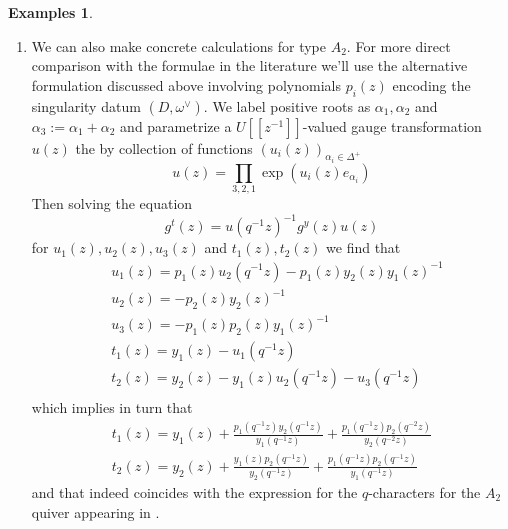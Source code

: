 \documentclass[11pt, oneside, reqno]{amsart}
\theoremstyle{definition} \newtheorem{definition}{Definition}[section]
\theoremstyle{definition} \newtheorem{remark}[definition]{Remark}
\theoremstyle{definition} \newtheorem{remarks}[definition]{Remarks}
\theoremstyle{definition} \newtheorem{question}[definition]{Question}
\theoremstyle{definition} \newtheorem*{note}{Note}
\theoremstyle{definition} \newtheorem{example}[definition]{Example}
\theoremstyle{definition} \newtheorem{examples}[definition]{Examples}
\begin{document}
\begin{examples}
\begin{enumerate}
 \item We can also make concrete calculations for type $A_2$.  For more direct comparison with the formulae in the literature we'll use the alternative formulation discussed above involving polynomials $p_i(z)$ encoding the singularity datum $(D, \omega^\vee)$.  We label positive roots as $\alpha_1, \alpha_2$ and $\alpha_3:=\alpha_1 + \alpha_2$ and parametrize a $U[[z^{-1}]]$-valued
  gauge transformation $u(z)$ the by collection of functions  
 $(u_{i}(z))_{\alpha_i  \in \Delta^{+}}$ 
  \begin{equation}
    u(z) = \prod_{3,2,1} \exp( u_{i}(z) e_{\alpha_i})
  \end{equation}
Then solving the equation 
\begin{equation}
g^t(z) =  u(q^{-1} z)^{-1} g^y(z) u(z)
\end{equation}
for $u_{1}(z), u_{2}(z), u_{3}(z)$ and $t_{1}(z), t_{2}(z)$  we find that
\begin{equation*}
\begin{aligned}
& u_{1}(z) = p_{1}(z) u_{2}(q^{-1} z)-p_{1}(z) y_{2}(z) y_{1}(z)^{-1} \\
& u_{2}(z) =  -p_{2}(z) y_{2}(z)^{-1} \\
& u_{3}(z) = -p_{1}(z) p_{2}(z) y_{1}(z)^{-1} \\
& t_{1}(z) = y_{1}(z)-u_{1}(q^{-1}z) \\
& t_{2}(z) = y_{2}(z) - y_{1}(z) u_{2}(q^{-1}z)-u_{3}(q^{-1}z) \\
\end{aligned}
\end{equation*}
which implies in turn that
\begin{equation*}
  \begin{aligned}
    t_{1}(z) =y_{1}(z)  +  \frac{p_{1}(q^{-1}z) y_{2}(q^{-1}z)}{y_{1}(q^{-1}z)} + \frac{p_{1}(q^{-1}z) p_{2}(q^{-2} z)}{ y_{2}(q^{-2} z)}\\
    t_{2}(z) = y_{2}(z)  +\frac{y_{1}(z) p_{2}(q^{-1}z)}{y_{2}(q^{-1}z)}+   \frac{p_{1}(q^{-1}z) p_{2}(q^{-1}z)}{y_{1}(q^{-1}z)}
  \end{aligned}
\end{equation*}
and that indeed coincides with the expression for the $q$-characters for the $A_2$ quiver appearing in
\cite{Nekrasov:2015wsu,NekrasovPestunShatashvili,NekrasovPestun,Kimura:2015rgi}.
\end{enumerate}
\end{examples}
\end{document}
